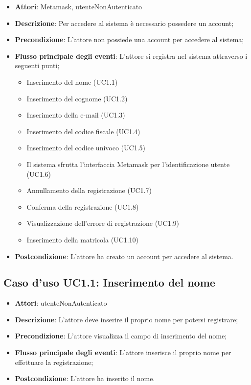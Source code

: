 \begin{itemize}
\item \textbf{Attori}: Metamask, utenteNonAutenticato
\item \textbf{Descrizione}: Per accedere al sistema è necessario possedere un account;
\item \textbf{Precondizione}: L'attore non possiede una account per accedere al sistema;
\item \textbf{Flusso principale degli eventi}: L'attore si registra nel sistema attraverso i seguenti punti;
\begin{itemize}
\item Inserimento del nome (UC1.1)
\item Inserimento del cognome (UC1.2)
\item Inserimento della e-mail (UC1.3)
\item Inserimento del codice fiscale (UC1.4)
\item Inserimento del codice univoco (UC1.5)
\item Il sistema sfrutta l'interfaccia Metamask per l'identificazione utente (UC1.6)
\item Annullamento della registrazione (UC1.7)
\item Conferma della registrazione (UC1.8)
\item Visualizzazione dell'errore di registrazione (UC1.9)
\item Inserimento della matricola (UC1.10)
\end{itemize}
\item \textbf{Postcondizione}: L'attore ha creato un account per accedere al sistema.
\end{itemize}
\subsection{Caso d'uso \texorpdfstring{UC1.1}{UC1.1}: Inserimento del nome}
\begin{itemize}
\item \textbf{Attori}: utenteNonAutenticato
\item \textbf{Descrizione}: L'attore deve inserire il proprio nome per potersi registrare;
\item \textbf{Precondizione}: L'attore visualizza il campo di inserimento del nome;
\item \textbf{Flusso principale degli eventi}: L'attore inserisce il proprio nome per effettuare la registrazione;
\item \textbf{Postcondizione}: L'attore ha inserito il nome.
\end{itemize}
